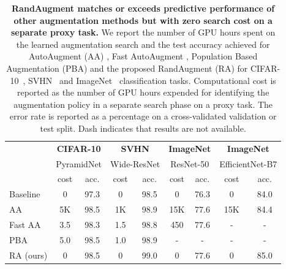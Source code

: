 \begin{table}[t]
\scriptsize
\begin{tabular}{l|cc|cc|cc|cc}
          & \multicolumn{2}{c|}{\textbf{CIFAR-10}} & \multicolumn{2}{c|}{\textbf{SVHN}} & \multicolumn{2}{c|}{\textbf{ImageNet}} & \multicolumn{2}{c}{\textbf{ImageNet}} \\
          & \multicolumn{2}{c|}{PyramidNet}        & \multicolumn{2}{c|}{Wide-ResNet}   & \multicolumn{2}{c|}{ResNet-50}         & \multicolumn{2}{c}{EfficientNet-B7}      \\ \hline
          & cost              & acc.              & cost            & acc.            & cost              & acc.              & cost              & acc.              \\ \hline
Baseline & 0 & 97.3 & 0 & 98.5 & 0 & 76.3 & 0 & 84.0 \\
\hline
AA        & 5K              & 98.5              & 1K            & 98.9            & 15K             & 77.6             & 15K             & 84.4            \\
Fast AA   & 3.5               & 98.3              & 1.5             & 98.8            & 450               & 77.6             & -                 & -                  \\
PBA       & 5.0               & 98.5              & 1.0             & 98.9            & -                 & -                  & -                 & -                  \\
RA (ours) & 0                 & 98.5              & 0               & 99.0            & 0                 & 77.6             & 0                 & 85.0             \\
\end{tabular}
\vspace{0.2cm}
\caption{\textbf{RandAugment matches or exceeds predictive performance of other augmentation methods but with zero search cost on a separate proxy task.} We report the number of GPU hours spent on the learned augmentation search and the test accuracy achieved for AutoAugment (AA) \cite{cubuk2018autoaugment}, Fast AutoAugment \cite{lim2019fast}, Population Based Augmentation (PBA) \cite{ho2019population} and the proposed RandAugment (RA) for CIFAR-10~\cite{krizhevsky2009learning}, SVHN~\cite{netzer2011reading} and ImageNet~\cite{imagenet2009} classification tasks. Computational cost is reported as the number of GPU hours expended for identifying the augmentation policy in a separate search phase on a proxy task. The error rate is reported as a percentage on a cross-validated validation or test split. Dash indicates that results are not available.}
\label{tab:summary_results}  
\end{table}